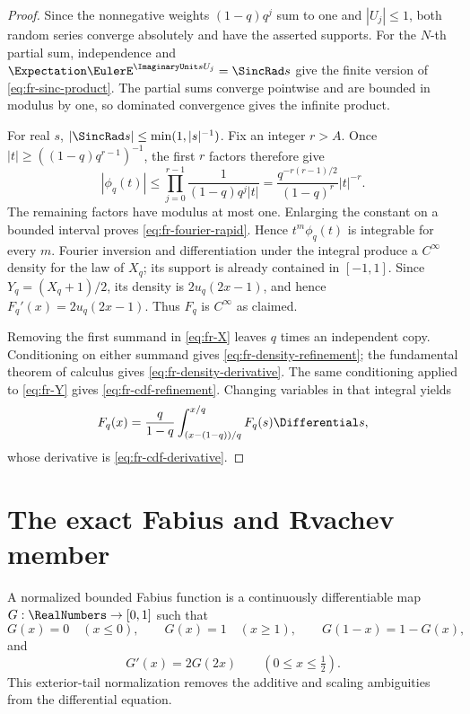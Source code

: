 \begin{proof}
Since the nonnegative weights \((1-q)q^j\) sum to one and
\(|U_j|\le1\), both random series converge absolutely and have the asserted
supports.  For the \(N\)-th partial sum, independence and
\(\Expectation\EulerE^{\ImaginaryUnit sU_j}=\SincRad s\) give the finite version of
\cref{eq:fr-sinc-product}.  The partial sums converge pointwise and are
bounded in modulus by one, so dominated convergence gives the infinite
product.

For real \(s\), \(|\SincRad s|\le\min(1,|s|^{-1})\).  Fix an integer \(r>A\).
Once \(|t|\ge((1-q)q^{r-1})^{-1}\), the first \(r\) factors therefore give
\[
 |\phi_q(t)|
 \le \prod_{j=0}^{r-1}\frac1{(1-q)q^j|t|}
 =\frac{q^{-r(r-1)/2}}{(1-q)^r}|t|^{-r}.
\]
The remaining factors have modulus at most one.  Enlarging the constant on a
bounded interval proves \cref{eq:fr-fourier-rapid}.  Hence
\(t^m\phi_q(t)\) is integrable for every \(m\).  Fourier inversion and
differentiation under the integral produce a \(C^\infty\) density for the
 law of \(X_q\); its support is already contained in \([-1,1]\).  Since
 \(Y_q=(X_q+1)/2\), its density is \(2u_q(2x-1)\), and hence
 \(F_q'(x)=2u_q(2x-1)\).  Thus \(F_q\) is \(C^\infty\) as claimed.

Removing the first summand in \cref{eq:fr-X} leaves \(q\) times an independent
copy.  Conditioning on either summand gives
\cref{eq:fr-density-refinement}; the fundamental theorem of calculus gives
\cref{eq:fr-density-derivative}.  The same conditioning applied to
\cref{eq:fr-Y} gives \cref{eq:fr-cdf-refinement}.  Changing variables in that
integral yields
\[
 F_q(x)=\frac q{1-q}
 \int_{(x-(1-q))/q}^{x/q}F_q(s)\Differential s,
\]
whose derivative is \cref{eq:fr-cdf-derivative}.
\end{proof}

\section{The exact Fabius and Rvachev member}
\label{sec:fr-fabius-member}

\begin{definition}
\label{def:fr-normalized-fabius}
A normalized bounded Fabius function is a continuously differentiable map
\(G:\RealNumbers\to[0,1]\) such that
\[
 G(x)=0\quad(x\le0),\qquad G(x)=1\quad(x\ge1),
 \qquad G(1-x)=1-G(x),
\]
and
\[
 G'(x)=2G(2x)\qquad(0\le x\le\tfrac12).
\]
This exterior-tail normalization removes the additive and scaling ambiguities
from the differential equation.
\end{definition}

